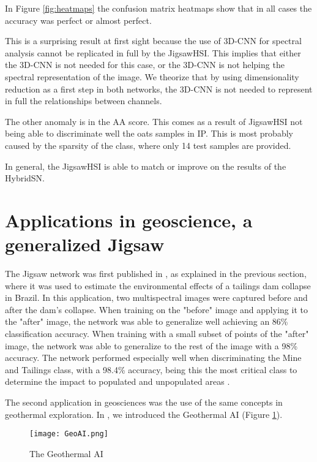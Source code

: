 \documentclass[lettersize, journal]{IEEEtran}
\begin{document}
In Figure \ref{fig:heatmaps} the confusion matrix heatmaps show that in all cases the accuracy was perfect or almost perfect.

This is a surprising result at first sight because the use of 3D-CNN for spectral analysis cannot be replicated in full by the JigsawHSI. This implies that either the 3D-CNN is not needed for this case, or the 3D-CNN is not helping the spectral representation of the image. We theorize that by using dimensionality reduction as a first step in both networks, the 3D-CNN is not needed to represent in full the relationships between channels.

The other anomaly is in the AA score. This comes as a result of JigsawHSI not being able to discriminate well the oats samples in IP. This is most probably caused by the sparsity of the class, where only 14 test samples are provided.

In general, the JigsawHSI is able to match or improve on the results of the HybridSN.

\section{Applications in geoscience, a generalized Jigsaw}
The Jigsaw network was first published in \cite{moraga_monitoring_2020}, as explained in the previous section, where it was used to estimate the environmental effects of a tailings dam collapse in Brazil. In this application, two multispectral images were captured before and after the dam's collapse. When training on the "before" image and applying it to the "after" image, the network was able to generalize well achieving an 86\% classification accuracy. When training with a small subset of points of the "after" image, the network was able to generalize to the rest of the image with a 98\% accuracy. The network performed especially well when discriminating the Mine and Tailings class, with a 98.4\% accuracy, being this the most critical class to determine the impact to populated and unpopulated areas \cite{moraga_monitoring_2020}.

The second application in geosciences was the use of the same concepts in geothermal exploration. In \cite{moraga_geothermal_2022}, we introduced the Geothermal AI (Figure \ref{fig:GeoAI}).

\begin{figure}[!htb]
    \centering
    \texttt{[image: GeoAI.png]}
    \caption{The Geothermal AI}
    \label{fig:GeoAI}
\end{figure}
\end{document}

